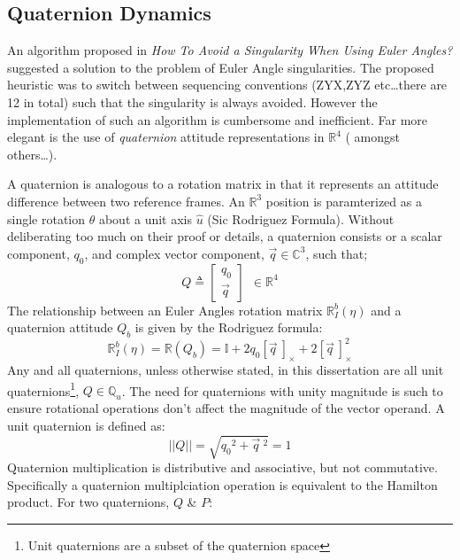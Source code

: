 \subsection{Quaternion Dynamics}
\label{subsec:dynamics.rigidbody.quaternion}
An algorithm proposed in \emph{How To Avoid a Singularity When Using Euler Angles?}\cite{euleranglesingularity} suggested a solution to the problem of Euler Angle singularities. The proposed heuristic was to switch between sequencing conventions (ZYX,ZYZ etc\ldots there are 12 in total) such that the singularity is always avoided. However the implementation of such an algorithm is cumbersome and inefficient. Far more elegant is the use of \emph{quaternion} attitude representations in $\mathbb{R}^4$ (\cite{rotationsequences,quaterniondynamics,spacecraftattitutdequaternions} amongst others\ldots).
\par
A quaternion is analogous to a rotation matrix in that it represents an attitude difference between two reference frames. An $\mathbb{R}^3$ position is paramterized as a single rotation $\theta$ about a unit axis $\hat{u}$ (Sic Rodriguez Formula\cite{unwinding}). Without deliberating too much on their proof or details, a quaternion consists or a scalar component, $q_0$, and complex vector component, $\vec{q}\in \mathbb{C}^3$, such that;
\begin{equation}
Q\triangleq 
\begin{bmatrix}
q_0 \\
\vec{q}
\end{bmatrix}
~~\in\mathbb{R}^4
\end{equation}
The relationship between an Euler Angles rotation matrix $\mathbb{R}_I^b(\eta)$ and a quaternion attitude $Q_b$ is given by the Rodriguez formula:
\begin{equation}\label{eq:rodriguez}
\mathbb{R}_I^b(\eta)=\mathbb{R}(Q_b)=\mathbb{I}+2q_0[\vec{q}~]_\times+2[\vec{q}~]^2_\times
\end{equation}
Any and all quaternions, unless otherwise stated, in this dissertation are all unit quaternions\footnote{Unit quaternions are a subset of the quaternion space}, $Q\in\mathbb{Q}_u$. The need for quaternions with unity magnitude is such to ensure rotational operations don't affect the magnitude of the vector operand. A unit quaternion is defined as:
\begin{equation}
||Q||=\sqrt{{q_0}^2+\vec{q}~^2}=1
\end{equation}
Quaternion multiplication is distributive and associative, but not commutative. Specifically a quaternion multiplciation operation is equivalent to the Hamilton product. For two quaternions, $Q$ \& $P$:

